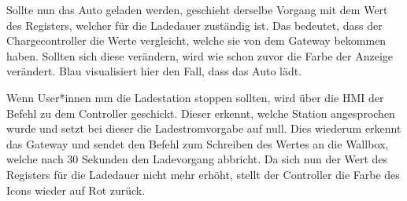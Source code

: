 Sollte nun das Auto geladen werden, geschieht derselbe Vorgang mit dem Wert des Registers, welcher für die Ladedauer zuständig ist. Das bedeutet, dass der Chargecontroller die Werte vergleicht, welche sie von dem Gateway bekommen haben. Sollten sich diese verändern, wird wie schon zuvor die Farbe der Anzeige verändert. Blau visualisiert hier den Fall, dass das Auto lädt.


Wenn User*innen nun die Ladestation stoppen sollten, wird über die HMI der Befehl zu dem Controller geschickt. Dieser erkennt, welche Station angesprochen wurde und setzt bei dieser die Ladestromvorgabe auf null. Dies wiederum erkennt das Gateway und sendet den Befehl zum Schreiben des Wertes an die Wallbox, welche nach 30 Sekunden den Ladevorgang abbricht. Da sich nun der Wert des Registers für die Ladedauer nicht mehr erhöht, stellt der Controller die Farbe des Icons wieder auf Rot zurück.